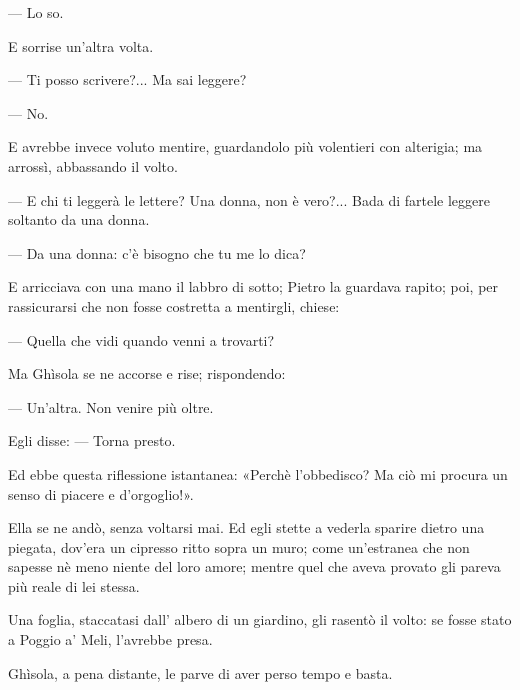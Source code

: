 — Lo so.

E sorrise un’altra volta.

— Ti posso scrivere?... Ma sai leggere?

— No.

E avrebbe invece voluto mentire, guardandolo più volentieri con alterigia; ma arrossì, abbassando il volto.

— E chi ti leggerà le lettere? Una donna, non è vero?... Bada di fartele leggere soltanto da una donna.

— Da una donna: c’è bisogno che tu me lo dica?

E arricciava con una mano il labbro di sotto; Pietro la guardava rapito; poi, per rassicurarsi che non fosse costretta a mentirgli, chiese:

— Quella che vidi quando venni a trovarti?

Ma Ghìsola se ne accorse e rise; rispondendo:

— Un’altra. Non venire più oltre.

Egli disse: — Torna presto.

Ed ebbe questa riflessione istantanea: «Perchè l’obbedisco? Ma ciò mi procura un senso di piacere e d’orgoglio!».

Ella se ne andò, senza voltarsi mai. Ed egli stette a vederla sparire dietro una piegata, dov'era un cipresso ritto sopra un muro; come un'estranea che non sapesse nè meno niente del loro amore; mentre quel che aveva provato gli pareva più reale di lei stessa.

Una foglia, staccatasi dall' albero di un giardino, gli rasentò il volto: se fosse stato a Poggio a' Meli, l'avrebbe presa.

Ghìsola, a pena distante, le parve di aver perso tempo e basta.

